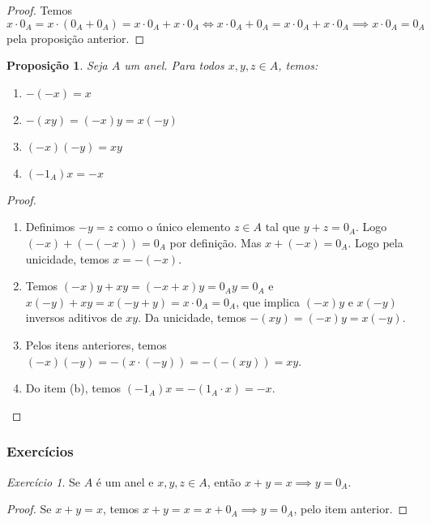 \documentclass{article}
\theoremstyle{plain}
\newtheorem{prop}{Proposição}[section]
\theoremstyle{definition}
\theoremstyle{remark}
\newtheorem{exercicio}{Exercício}[subsection]
\begin{document}
\begin{proof}
	Temos $x\cdot 0_A = x\cdot (0_A + 0_A) = x\cdot 0_A +x\cdot 0_A \iff x\cdot 0_A + 0_A = x\cdot 0_A + x\cdot 0_A \implies x\cdot 0_A = 0_A $ pela proposição anterior.
\end{proof}
\begin{prop}
	Seja $A$  um anel. Para todos $x,y,z \in A$, temos:
	\begin{enumerate}[label=(\alph*)]
		\item $-(-x) = x$
		\item $-(xy) = (-x)y = x(-y)$
		\item $(-x)(-y) = xy$
		\item $(-1_A)x = -x$
	\end{enumerate}
\end{prop}
\begin{proof}
	~\\
	
	\begin{enumerate}[label=(\alph*)]
		\item Definimos $-y = z$ como o único elemento $z\in A$ tal que $y + z = 0_A $.   Logo $(-x) +(-(-x)) =   0_A$ por definição. Mas $x + (-x) = 0_A$. Logo pela unicidade, temos $x =-(-x)$.
		\item Temos  $(-x)y +xy = (-x+x)y = 0_A y = 0_A$ e $x(-y) +xy = x(-y+y) = x\cdot 0_A = 0_A$, que implica $(-x)y$ e $x(-y)$ inversos aditivos de $xy$. Da unicidade, temos $-(xy) = (-x)y = x(-y)$.
		\item Pelos itens anteriores, temos $(-x)(-y) = -(x\cdot (-y)) = -(-(xy)) = xy$.
		\item Do item (b), temos $(-1_A)x = -(1_A\cdot x) = -x$.
	\end{enumerate}
\end{proof}
\subsubsection{Exercícios}
\begin{exercicio}
	Se $A$ é um anel e $x,y,z\in A$, então $x+y = x \implies y = 0_A$.
\end{exercicio}
\begin{proof}
		Se $x+y = x$, temos $x+y = x = x+0_A \implies y = 0_A$, pelo item anterior.
\end{proof}
\end{document}
